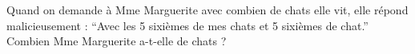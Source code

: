 \documentclass[a4paper,12pt]{report}
\begin{document}
\vspace*{-2\baselineskip}



\begin{acti}
Quand on demande à Mme Marguerite avec combien de chats elle vit, elle répond malicieusement : \enquote{Avec les 5 sixièmes de mes chats et 5 sixièmes de chat.} Combien Mme Marguerite a-t-elle de chats ?
\end{acti}
\begin{comment}
	\begin{acti}
Résoudre les équations de l'exercice 81 . [( $\left.{ }^*\right)$ Pour la seconde, utiliser la complétion du carré.]
	\end{acti}
	\begin{acti}
(*) En utilisant des identités remarquables, écrire les nombres suivants sous la forme de deux nombres entiers supérieurs à 1 . (Indiquer les étapes de manière détaillée.)
		\begin{tasks}
\task $1.014 \cdot 049$
\task $899^{\circ} 999^{\circ} 879$
\task $256^{\circ} 027$
\task 159'991
\task $99^{\circ} 940^{\circ} 009$ (pensez à soustraire)
\task $81^{\circ} 053^{\circ} 993$
\task 10'807
\task 491'401
		\end{tasks}
	\end{acti}
\end{comment}
\end{document}
